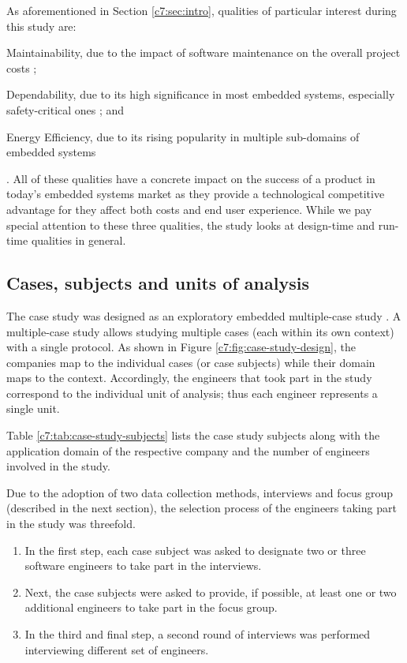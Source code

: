 As aforementioned in Section \ref{c7:sec:intro}, qualities of particular interest during this study are:
\begin{inlinelist}\item Maintainability, due to the impact of software maintenance on the overall project costs \cite{Erlikh2000}; \item Dependability, due to its high significance in most embedded systems, especially safety-critical ones \cite{Knight2002}; and \item Energy Efficiency, due to its rising popularity in multiple sub-domains of embedded systems \cite{Koopman2004} \end{inlinelist}.
All of these qualities have a concrete impact on the success of a product in today's embedded systems market as they provide a technological competitive advantage for they affect both costs and end user experience.
While we pay special attention to these three qualities, the study looks at design-time and run-time qualities in general. 

\subsection{Cases, subjects and units of analysis}
The case study was designed as an exploratory embedded multiple-case study \cite{Runeson2012}.
A multiple-case study allows studying multiple cases (each within its own context) with a single protocol.
As shown in Figure \ref{c7:fig:case-study-design}, the companies map to the individual cases (or case subjects) while their domain maps to the context.
Accordingly, the engineers that took part in the study correspond to the individual unit of analysis; thus each engineer represents a single unit.

Table \ref{c7:tab:case-study-subjects} lists the case study subjects along with the application domain of the respective company and the number of engineers involved in the study.

Due to the adoption of two data collection methods, interviews and focus group (described in the next section),  the selection process of the engineers taking part in the study was threefold.
\begin{enumerate}
    \item In the first step, each case subject was asked to designate two or three software engineers to take part in the interviews.
    \item Next, the case subjects were asked to provide, if possible, at least one or two additional engineers to take part in the focus group.
    \item In the third and final step, a second round of interviews was performed interviewing different set of engineers.
\end{enumerate}

